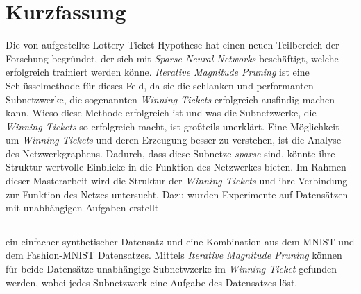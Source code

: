 \chapter*{Kurzfassung}

Die von \textcite{LTH} aufgestellte Lottery Ticket Hypothese hat einen neuen Teilbereich der Forschung begründet, der sich mit \textit{Sparse Neural Networks} beschäftigt, welche erfolgreich trainiert werden könne.
\textit{Iterative Magnitude Pruning} ist eine Schlüsselmethode für dieses Feld, da sie die schlanken und performanten Subnetzwerke, die sogenannten \textit{Winning Tickets} erfolgreich ausfindig machen kann.
Wieso diese Methode erfolgreich ist und was die Subnetzwerke, die \textit{Winning Tickets} so erfolgreich macht, ist großteils unerklärt.
Eine Möglichkeit um \textit{Winning Tickets} und deren Erzeugung besser zu verstehen, ist die Analyse des Netzwerkgraphens.
Dadurch, dass diese Subnetze \textit{sparse} sind, könnte ihre Struktur wertvolle Einblicke in die Funktion des Netzwerkes bieten.
Im Rahmen dieser Masterarbeit wird die Struktur der \textit{Winning Tickets} und ihre Verbindung zur Funktion des Netzes untersucht.
Dazu wurden Experimente auf Datensätzen mit unabhängigen Aufgaben erstellt \rule[0.5ex]{.5em}{0.5pt} ein einfacher synthetischer Datensatz und eine Kombination aus dem MNIST und dem Fashion-MNIST Datensatzes.
Mittels \textit{Iterative Magnitude Pruning} können für beide Datensätze unabhängige Subnetwzerke im \textit{Winning Ticket} gefunden werden, wobei jedes Subnetzwerk eine Aufgabe des Datensatzes löst.